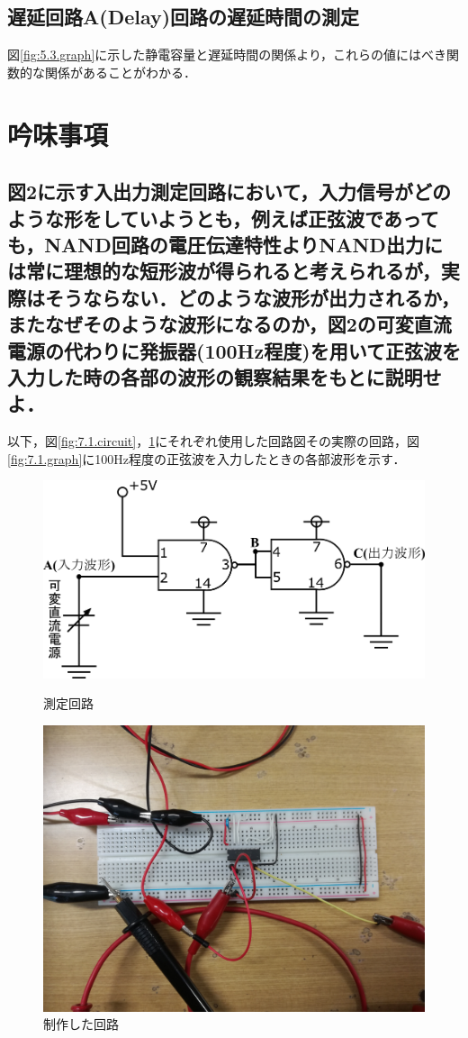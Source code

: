 \documentclass[10pt, a4j, dvipdfmx]{jarticle}
\begin{document}
\subsection{遅延回路A(Delay)回路の遅延時間の測定}
図\ref{fig:5.3.graph}に示した静電容量と遅延時間の関係より，これらの値にはべき関数的な関係があることがわかる．


\newpage
\section{吟味事項}
\subsection{図2に示す入出力測定回路において，入力信号がどのような形をしていようとも，例えば正弦波であっても，NAND回路の電圧伝達特性よりNAND出力には常に理想的な短形波が得られると考えられるが，実際はそうならない．どのような波形が出力されるか，またなぜそのような波形になるのか，図2の可変直流電源の代わりに発振器(100Hz程度)を用いて正弦波を入力した時の各部の波形の観察結果をもとに説明せよ．}
以下，図\ref{fig:7.1.circuit}，\ref{fig:7.1.camera}にそれぞれ使用した回路図その実際の回路，図\ref{fig:7.1.graph}に100Hz程度の正弦波を入力したときの各部波形を示す．
\begin{figure}[H]
 	\begin{minipage}{0.5\hsize}
    	\centering
   		\includegraphics[width=\hsize]{images/Experiment/7_1_circuit.png}
		\caption{測定回路}
		\label{fig:7.1.circuit}
	\end{minipage}
	\begin{minipage}{0.5\hsize}
    	\centering
		\includegraphics[width=0.8\hsize]{images/camera/7_1_camera.jpg}
    	\caption{制作した回路}
		\label{fig:7.1.camera}
  \end{minipage}
\end{figure}
\end{document}
